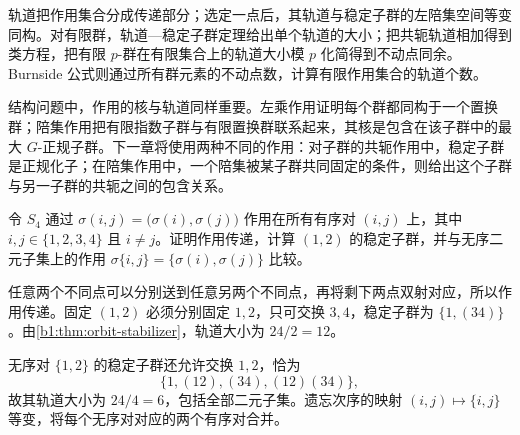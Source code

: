 




\begin{chaptersummary}
	轨道把作用集合分成传递部分；选定一点后，其轨道与稳定子群的左陪集空间等变同构。对有限群，轨道—稳定子群定理给出单个轨道的大小；把共轭轨道相加得到类方程，把有限 \(p\)-群在有限集合上的轨道大小模 \(p\) 化简得到不动点同余。Burnside 公式则通过所有群元素的不动点数，计算有限作用集合的轨道个数。

	\ProseParagraphBreak
	结构问题中，作用的核与轨道同样重要。左乘作用证明每个群都同构于一个置换群；陪集作用把有限指数子群与有限置换群联系起来，其核是包含在该子群中的最大 \(G\)-正规子群。下一章将使用两种不同的作用：对子群的共轭作用中，稳定子群是正规化子；在陪集作用中，一个陪集被某子群共同固定的条件，则给出这个子群与另一子群的共轭之间的包含关系。
\end{chaptersummary}

\BookExercises

\begin{exercise}\label{b1:ex:04-1}
	令 \(S_4\) 通过 \(\sigma(i,j)=\bigl(\sigma(i),\sigma(j)\bigr)\) 作用在所有有序对 \((i,j)\) 上，其中 \(i,j\in\{1,2,3,4\}\) 且 \(i\neq j\)。证明作用传递，计算 \((1,2)\) 的稳定子群，并与无序二元子集上的作用 \(\sigma\{i,j\}=\bigl\{\sigma(i),\sigma(j)\bigr\}\) 比较。
\end{exercise}
\begin{solution}
	任意两个不同点可以分别送到任意另两个不同点，再将剩下两点双射对应，所以作用传递。固定 \((1,2)\) 必须分别固定 \(1,2\)，只可交换 \(3,4\)，稳定子群为 \(\bigl\{1,(34)\bigr\}\)。由\cref{b1:thm:orbit-stabilizer}，轨道大小为 \(24/2=12\)。

	无序对 \(\{1,2\}\) 的稳定子群还允许交换 \(1,2\)，恰为
	\[
		\bigl\{1,(12),(34),(12)(34)\bigr\},
	\]
	故其轨道大小为 \(24/4=6\)，包括全部二元子集。遗忘次序的映射 \((i,j)\mapsto\{i,j\}\) 等变，将每个无序对对应的两个有序对合并。
\end{solution}

